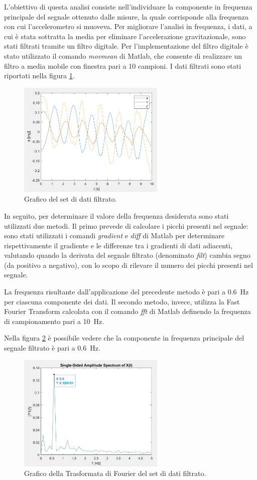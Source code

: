 L'obiettivo di questa analisi consiste nell'individuare la componente in frequenza principale del segnale ottenuto dalle misure, la quale corrisponde alla frequenza con cui l'accelerometro si muoveva. Per migliorare l'analisi in frequenza, i dati, a cui è stata sottratta la media per eliminare l'accelerazione gravitazionale, sono stati filtrati tramite un filtro digitale. Per l'implementazione del filtro digitale è stato utilizzato il comando \textit{movmean} di Matlab, che consente di realizzare un filtro a media mobile con finestra pari a 10 campioni. I dati filtrati sono stati riportati nella figura \ref{fig:plot_dati_filt}.
\begin{figure}[h]
	\centering		
	\includegraphics[width=7cm]{./ImageFiles/plot1filt_arr2.png}
	\caption{Grafico del set di dati filtrato.}
	\label{fig:plot_dati_filt}
\end{figure}
In seguito, per determinare il valore della frequenza desiderata sono stati utilizzati due metodi. Il primo prevede di calcolare i picchi presenti nel segnale: sono stati utilizzati i comandi \textit{gradient} e \textit{diff} di Matlab per determinare rispettivamente il gradiente e le differenze tra i gradienti di dati adiacenti, valutando quando la derivata del segnale filtrato (denominato \textit{filt}) cambia segno (da positivo a negativo), con lo scopo di rilevare il numero dei picchi presenti nel segnale.

La frequenza risultante dall'applicazione del precedente metodo è pari a \SI{0.6}{\hertz} per ciascuna componente dei dati.
Il secondo metodo, invece, utilizza la Fast Fourier Transform calcolata con il comando \textit{fft} di Matlab definendo la frequenza di campionamento pari a \SI{10}{\hertz}.

Nella figura \ref{fig:plot_fft} è possibile vedere che la componente in frequenza principale del segnale filtrato è pari a \SI{0.6}{\hertz}.
\begin{figure}[tbh]
	\centering		\includegraphics[width=7cm]{./ImageFiles/plot2_arr2.png}
	\caption{Grafico della Trasformata di Fourier del set di dati filtrato.}
	\label{fig:plot_fft}
\end{figure}